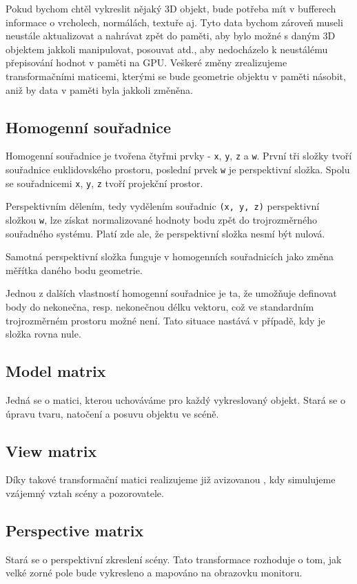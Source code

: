 Pokud bychom chtěl vykreslit nějaký 3D objekt, bude potřeba mít v bufferech informace o vrcholech, normálách, textuře aj. Tyto data bychom zároveň museli neustále aktualizovat a nahrávat zpět do paměti, aby bylo možné s daným 3D objektem jakkoli manipulovat, posouvat atd., aby nedocházelo k neustálému přepisování hodnot v paměti na GPU. \cite{zdrojak} Veškeré změny zrealizujeme transformačními maticemi, kterými se bude geometrie objektu v paměti násobit, aniž by data v paměti byla jakkoli změněna.

\subsection{Homogenní souřadnice}
Homogenní souřadnice je tvořena čtyřmi prvky - \texttt{x}, \texttt{y}, \texttt{z} a \texttt{w}. První tři složky tvoří souřadnice euklidovského prostoru, poslední prvek \texttt{w} je perspektivní složka. Spolu se souřadnicemi \texttt{x}, \texttt{y}, \texttt{z} tvoří projekční prostor.\cite{WebGLbeg}

Perspektivním dělením, tedy vydělením souřadnic \texttt{(x, y, z)} perspektivní složkou \texttt{w}, lze získat normalizované hodnoty bodu zpět do trojrozměrného souřadného systému. Platí zde ale, že perspektivní složka nesmí být nulová. 

Samotná perspektivní složka funguje v homogenních souřadnicích jako změna měřítka daného bodu geometrie.

Jednou z dalších vlastností homogenní souřadnice je ta, že umožňuje definovat body do nekonečna, resp. nekonečnou délku vektoru, což ve standardním trojrozměrném prostoru možné není. Tato situace nastává v případě, kdy je složka rovna nule.

\subsection{Model matrix}
Jedná se o matici, kterou uchováváme pro každý vykreslovaný objekt. Stará se o úpravu tvaru, natočení a posuvu objektu ve scéně.  

\subsection{View matrix}
Díky takové transformační matici realizujeme již avizovanou , kdy simulujeme vzájemný vztah scény a pozorovatele.

\subsection{Perspective matrix}
Stará se o perspektivní zkreslení scény. Tato transformace rozhoduje o tom, jak velké zorné pole bude vykresleno a mapováno 
na obrazovku monitoru. \cite{zdrojak}

